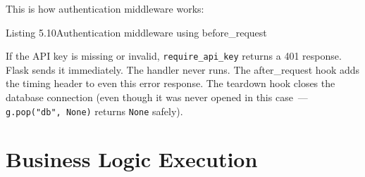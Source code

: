 This is how authentication middleware works:

\begin{codeboxcap}[short]{\textcolor{accent}{Listing 5.10}\enspace Authentication middleware using before\_request}

\begin{Shaded}
\begin{Highlighting}[]

    \OperatorTok{==} \NormalTok{:}
           

\OperatorTok{=}\NormalTok{, }\NormalTok{)}
\OperatorTok{=}\NormalTok{, }\NormalTok{)}
      
        \NormalTok{: }\NormalTok{\}), }
\end{Highlighting}
\end{Shaded}

\end{codeboxcap}

\noindent{}If the API key is missing or invalid, \texttt{require\_api\_key} returns a 401 response. Flask sends it immediately. The handler never runs. The after\_request hook adds the timing header to even this error response. The teardown hook closes the database connection (even though it was never opened in this case~--- \texttt{g.pop("db",\ None)} returns \texttt{None} safely).

\setcounter{section}{6}
\section{Business Logic Execution}\label{05-internal-request-execution:57-business-logic-execution}

